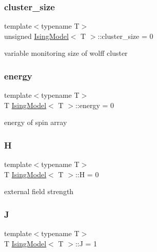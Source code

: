 \subsubsection{\texorpdfstring{cluster\+\_\+size}{cluster\_size}}
{\footnotesize\ttfamily template$<$typename T$>$ \\
unsigned \mbox{\hyperlink{classIsingModel}{Ising\+Model}}$<$ T $>$\+::cluster\+\_\+size = 0\hspace{0.3cm}{\ttfamily [private]}}

variable monitoring size of wolff cluster \mbox{\label{classIsingModel_abd38e1a93e1e7bab7788f00d0b9fddb9}} 
\subsubsection{\texorpdfstring{energy}{energy}}
{\footnotesize\ttfamily template$<$typename T$>$ \\
T \mbox{\hyperlink{classIsingModel}{Ising\+Model}}$<$ T $>$\+::energy = 0\hspace{0.3cm}{\ttfamily [private]}}

energy of spin array \mbox{\label{classIsingModel_a19e1a223476c953a9964532c7f0eb6dd}} 
\subsubsection{\texorpdfstring{H}{H}}
{\footnotesize\ttfamily template$<$typename T$>$ \\
T \mbox{\hyperlink{classIsingModel}{Ising\+Model}}$<$ T $>$\+::H = 0\hspace{0.3cm}{\ttfamily [private]}}

external field strength \mbox{\label{classIsingModel_af0c6d48208741fe5a378e29b7fac0da1}} 
\subsubsection{\texorpdfstring{J}{J}}
{\footnotesize\ttfamily template$<$typename T$>$ \\
T \mbox{\hyperlink{classIsingModel}{Ising\+Model}}$<$ T $>$\+::J = 1\hspace{0.3cm}{\ttfamily [private]}}

